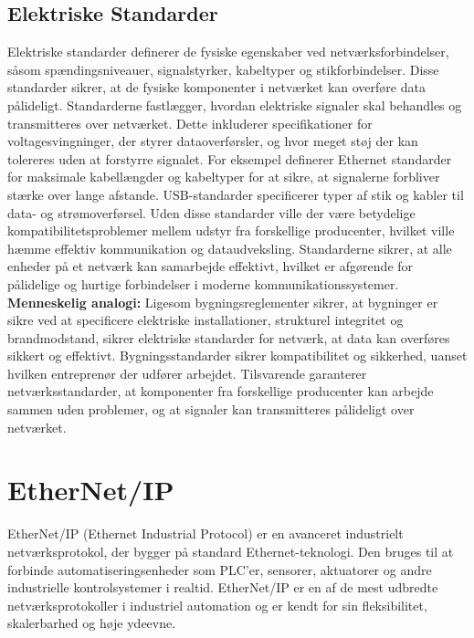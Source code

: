 \subsection{Elektriske Standarder}
Elektriske standarder definerer de fysiske egenskaber ved netværksforbindelser, såsom spændingsniveauer, signalstyrker, kabeltyper og stikforbindelser. Disse standarder sikrer, at de fysiske komponenter i netværket kan overføre data pålideligt.
\newline
\newline
\noindent Standarderne fastlægger, hvordan elektriske signaler skal behandles og transmitteres over netværket. Dette inkluderer specifikationer for voltagesvingninger, der styrer dataoverførsler, og hvor meget støj der kan tolereres uden at forstyrre signalet. For eksempel definerer Ethernet standarder for maksimale kabellængder og kabeltyper for at sikre, at signalerne forbliver stærke over lange afstande. USB-standarder specificerer typer af stik og kabler til data- og strømoverførsel.
\newline
\newline
\noindent Uden disse standarder ville der være betydelige kompatibilitetsproblemer mellem udstyr fra forskellige producenter, hvilket ville hæmme effektiv kommunikation og dataudveksling. Standarderne sikrer, at alle enheder på et netværk kan samarbejde effektivt, hvilket er afgørende for pålidelige og hurtige forbindelser i moderne kommunikationssystemer.
\newline
\newline
\noindent \textbf{Menneskelig analogi:}
Ligesom bygningsreglementer sikrer, at bygninger er sikre ved at specificere elektriske installationer, strukturel integritet og brandmodstand, sikrer elektriske standarder for netværk, at data kan overføres sikkert og effektivt. Bygningsstandarder sikrer kompatibilitet og sikkerhed, uanset hvilken entreprenør der udfører arbejdet. Tilsvarende garanterer netværksstandarder, at komponenter fra forskellige producenter kan arbejde sammen uden problemer, og at signaler kan transmitteres pålideligt over netværket.


\section{EtherNet/IP}
EtherNet/IP (Ethernet Industrial Protocol) er en avanceret industrielt netværksprotokol, der bygger på standard Ethernet-teknologi. Den bruges til at forbinde automatiseringsenheder som PLC'er, sensorer, aktuatorer og andre industrielle kontrolsystemer i realtid. EtherNet/IP er en af de mest udbredte netværksprotokoller i industriel automation og er kendt for sin fleksibilitet, skalerbarhed og høje ydeevne.

